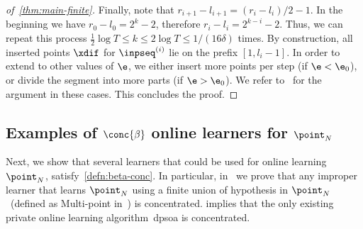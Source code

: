 \begin{proof}[of~\cref{thm:main-finite}]
    Finally, note that \(r_{i+1} - l_{i+1} = (r_i - l_i) / 2 - 1\). In the beginning we have \(r_0 - l_0 = 2^k - 2\), therefore \(r_i - l_i = 2^{k - i} - 2\). Thus, we can repeat this process \(\frac{1}{2} \log T \leq k \leq 2 \log T \leq 1/(16\delta)\) times. By construction, all inserted points \(\xdif\) for \(\inpseq^{(i)}\) lie on the prefix \([1, l_i - 1]\). In order to extend to other values of \(\e\), we either insert more points per step (if \(\e < \e_0\)), 
    or divide the segment into more parts (if \(\e > \e_0\)). We refer to~ for the argument in these cases. This concludes the proof.
\end{proof}

\subsection{Examples of \(\conc{\beta}\) online learners for \(\point_N\)}
\label{sec:example-conc}
Next, we show that several learners that could be used for online learning \(\point_N\), satisfy~\cref{defn:beta-conc}. In particular, in~ we prove that any improper learner that learns \(\point_N\) using a finite union of hypothesis in \(\point_N\)~(defined as Multi-point in~) is concentrated.  implies that the only existing private online learning algorithm~\Gls{dpsoa} is concentrated.


